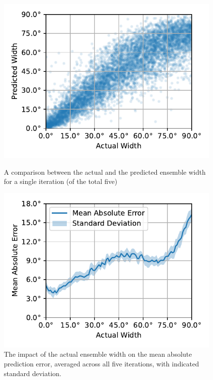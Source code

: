 \documentclass{article}
\begin{document}
\begin{figure}[ht]
  \centering
  \begin{minipage}[t]{0.45\linewidth}
    \includegraphics[width=\linewidth]{../figures/actual_vs_predicted_width.pdf}
    \caption{\label{fig:actual_vs_predicted_width}A comparison between the actual and the predicted ensemble width for a single iteration (of the total five) }
  \end{minipage}
  \hspace{0.5cm} 
  \begin{minipage}[t]{0.45\linewidth}
    \includegraphics[width=\linewidth]{../figures/mae_width.pdf}
    \caption{\label{fig:mae_width}The impact of the actual ensemble width on the mean absolute prediction error, averaged across all five iterations, with indicated standard deviation.}
  \end{minipage}
\end{figure}
\end{document}
